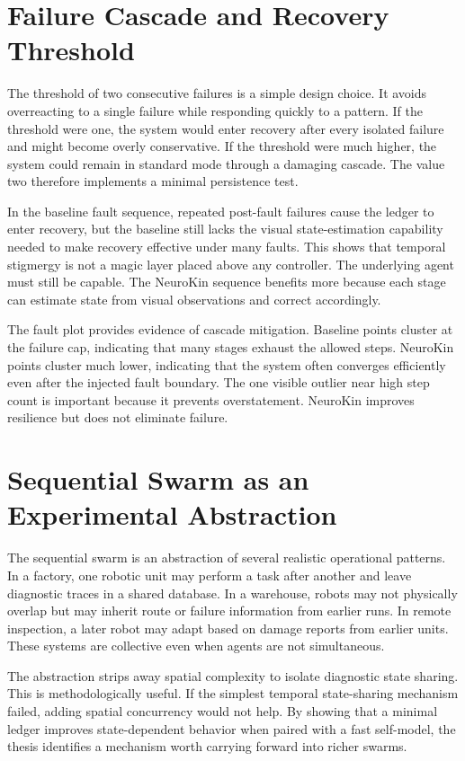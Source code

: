 \documentclass[12pt,a4paper,oneside]{report}
\begin{document}
\section{Failure Cascade and Recovery Threshold}

The threshold of two consecutive failures is a simple design choice. It avoids overreacting to a single failure while responding quickly to a pattern. If the threshold were one, the system would enter recovery after every isolated failure and might become overly conservative. If the threshold were much higher, the system could remain in standard mode through a damaging cascade. The value two therefore implements a minimal persistence test.

In the baseline fault sequence, repeated post-fault failures cause the ledger to enter recovery, but the baseline still lacks the visual state-estimation capability needed to make recovery effective under many faults. This shows that temporal stigmergy is not a magic layer placed above any controller. The underlying agent must still be capable. The NeuroKin sequence benefits more because each stage can estimate state from visual observations and correct accordingly.

The fault plot provides evidence of cascade mitigation. Baseline points cluster at the failure cap, indicating that many stages exhaust the allowed steps. NeuroKin points cluster much lower, indicating that the system often converges efficiently even after the injected fault boundary. The one visible outlier near high step count is important because it prevents overstatement. NeuroKin improves resilience but does not eliminate failure.

\section{Sequential Swarm as an Experimental Abstraction}

The sequential swarm is an abstraction of several realistic operational patterns. In a factory, one robotic unit may perform a task after another and leave diagnostic traces in a shared database. In a warehouse, robots may not physically overlap but may inherit route or failure information from earlier runs. In remote inspection, a later robot may adapt based on damage reports from earlier units. These systems are collective even when agents are not simultaneous.

The abstraction strips away spatial complexity to isolate diagnostic state sharing. This is methodologically useful. If the simplest temporal state-sharing mechanism failed, adding spatial concurrency would not help. By showing that a minimal ledger improves state-dependent behavior when paired with a fast self-model, the thesis identifies a mechanism worth carrying forward into richer swarms.
\end{document}
